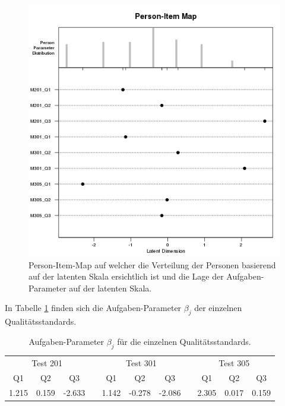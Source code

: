  \begin{figure}[htbp]
 
 \centering
 \includegraphics[width=0.8\linewidth]{graphics/PersonItemMap.png}
 \caption{Person-Item-Map auf welcher die Verteilung der Personen basierend auf der latenten Skala ersichtlich ist und die Lage der Aufgaben-Parameter auf der latenten Skala. }
 \label{fig:PersonItemMapQ}
 \end{figure}
 
 In Tabelle \ref{tab:betaQ} finden sich die Aufgaben-Parameter $\beta_j$ der einzelnen Qualitätsstandards.
 
 \begin{table}[htbp]
   \centering
 \begin{tabular}{ccccccccccc}
 \toprule
  \multicolumn{3}{c}{Test 201} &&  \multicolumn{3}{c}{Test 301}&&  \multicolumn{3}{c}{Test 305}\\ 
  Q1 & Q2 & Q3 && Q1 & Q2 & Q3 && Q1 & Q2 & Q3  \\ 
 \midrule
   1.215 & 0.159 & -2.633 && 1.142 & -0.278 & -2.086 && 2.305 & 0.017 & 0.159   \\ 
 
 \bottomrule
 \end{tabular} 
   \caption{Aufgaben-Parameter $\beta_j$ für die einzelnen Qualitätsstandards. }
   \label{tab:betaQ}
 \end{table}